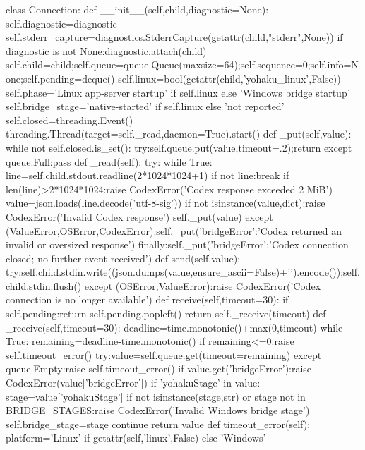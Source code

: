 class Connection:
    def __init__(self,child,diagnostic=None):
        self.diagnostic=diagnostic
        self.stderr_capture=diagnostics.StderrCapture(getattr(child,"stderr",None))
        if diagnostic is not None:diagnostic.attach(child)
        self.child=child;self.queue=queue.Queue(maxsize=64);self.sequence=0;self.info=None;self.pending=deque()
        self.linux=bool(getattr(child,'yohaku_linux',False))
        self.phase='Linux app-server startup' if self.linux else 'Windows bridge startup'
        self.bridge_stage='native-started' if self.linux else 'not reported'
        self.closed=threading.Event()
        threading.Thread(target=self._read,daemon=True).start()
    def _put(self,value):
        while not self.closed.is_set():
            try:self.queue.put(value,timeout=.2);return
            except queue.Full:pass
    def _read(self):
        try:
            while True:
                line=self.child.stdout.readline(2*1024*1024+1)
                if not line:break
                if len(line)>2*1024*1024:raise CodexError('Codex response exceeded 2 MiB')
                value=json.loads(line.decode('utf-8-sig'))
                if not isinstance(value,dict):raise CodexError('Invalid Codex response')
                self._put(value)
        except (ValueError,OSError,CodexError):self._put({'bridgeError':'Codex returned an invalid or oversized response'})
        finally:self._put({'bridgeError':'Codex connection closed; no further event received'})
    def send(self,value):
        try:self.child.stdin.write((json.dumps(value,ensure_ascii=False)+'\n').encode());self.child.stdin.flush()
        except (OSError,ValueError):raise CodexError('Codex connection is no longer available')
    def receive(self,timeout=30):
        if self.pending:return self.pending.popleft()
        return self._receive(timeout)
    def _receive(self,timeout=30):
        deadline=time.monotonic()+max(0,timeout)
        while True:
            remaining=deadline-time.monotonic()
            if remaining<=0:raise self.timeout_error()
            try:value=self.queue.get(timeout=remaining)
            except queue.Empty:raise self.timeout_error()
            if value.get('bridgeError'):raise CodexError(value['bridgeError'])
            if 'yohakuStage' in value:
                stage=value['yohakuStage']
                if not isinstance(stage,str) or stage not in BRIDGE_STAGES:raise CodexError('Invalid Windows bridge stage')
                self.bridge_stage=stage
                continue
            return value
    def timeout_error(self):
        platform='Linux' if getattr(self,'linux',False) else 'Windows'
